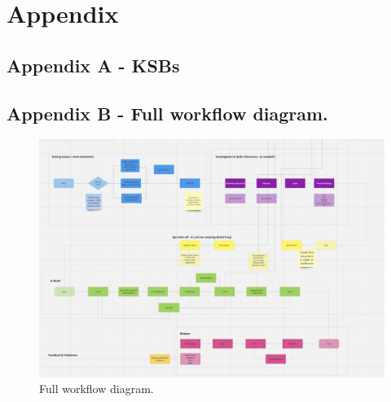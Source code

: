 
\section{Appendix}
  \subsection{Appendix A - KSBs}
  
  
  
  
  
  

  
  
  

  
  
  
  
  
  
  
  
  
  
  

  
  
  
  
  

  

  \begin{landscape}
    \subsection{Appendix B - Full workflow diagram.}
      \begin{figure}[H]
        \centering
        \includegraphics[width=18cm]{assets/workflow/fullWorkflow.png}
        \caption{Full workflow diagram.}
      \end{figure}  
  \end{landscape}

